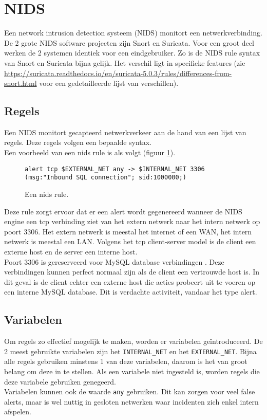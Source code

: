 \documentclass[a4paper,12pt]{report}
\begin{document}
\section{NIDS}
Een network intrusion detection systeem (NIDS) monitort een netwerkverbinding.
\\
De 2 grote NIDS software projecten zijn Snort en Suricata.
Voor een groot deel werken de 2 systemen identiek voor een eindgebruiker.
Zo is de NIDS rule syntax van Snort en Suricata bijna gelijk.
Het verschil ligt in specifieke features (zie \url{https://suricata.readthedocs.io/en/suricata-5.0.3/rules/differences-from-snort.html} voor een gedetailleerde lijst van verschillen).

\subsection{Regels}
Een NIDS monitort gecapteerd netwerkverkeer aan de hand van een lijst van regels.
Deze regels volgen een bepaalde syntax.
\\
Een voorbeeld van een nids rule is als volgt (figuur \ref{fig:nids-rule}).
\begin{figure}[h]
  \begin{lstlisting}
alert tcp $EXTERNAL_NET any -> $INTERNAL_NET 3306 (msg:"Inbound SQL connection"; sid:1000000;)
  \end{lstlisting}
  \caption{Een nids rule.}
  \label{fig:nids-rule}
\end{figure}
Deze rule zorgt ervoor dat er een alert wordt gegenereerd wanneer de NIDS engine een tcp verbinding ziet van het extern netwerk naar het intern netwerk op poort 3306.
Het extern netwerk is meestal het internet of een WAN, het intern netwerk is meestal een LAN.
Volgens het tcp client-server model is de client een externe host en de server een interne host.
\\
Poort 3306 is gereserveerd voor MySQL database verbindingen \autocite{iana:ports}.
Deze verbindingen kunnen perfect normaal zijn als de client een vertrouwde host is.
In dit geval is de client echter een externe host die acties probeert uit te voeren op een interne MySQL database.
Dit is verdachte activiteit, vandaar het type alert.

\subsection{Variabelen}
Om regels zo effectief mogelijk te maken, worden er variabelen geïntroduceerd.
De 2 meest gebruikte variabelen zijn het \verb!INTERNAL_NET! en het \verb!EXTERNAL_NET!.
Bijna alle regels gebruiken minstens 1 van deze variabelen, daarom is het van groot belang om deze in te stellen.
Als een variabele niet ingesteld is, worden regels die deze variabele gebruiken genegeerd.
\\
Variabelen kunnen ook de waarde \verb!any! gebruiken.
Dit kan zorgen voor veel false alerts, maar is wel nuttig in gesloten netwerken waar incidenten zich enkel intern afspelen.
\end{document}
